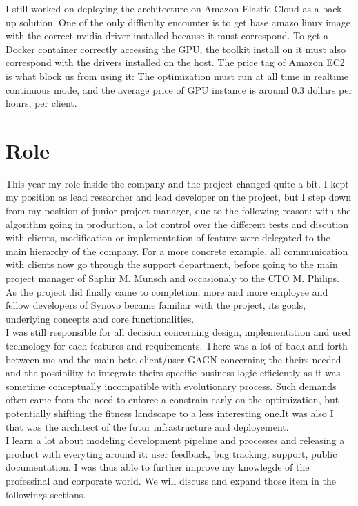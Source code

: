 \documentclass[12pt]{memoir}
\begin{document}
I still worked on deploying the architecture on Amazon Elastic Cloud as a back-up
solution. One of the only difficulty encounter is to get base amazo linux image with the
correct nvidia driver installed because it must correspond. To get a Docker
container correctly accessing the GPU, the toolkit install on it must also
correspond with the drivers installed on the host.
The price tag of Amazon EC2 is what block us from using it: The optimization must
run at all time in realtime continuous mode, and the average price of GPU instance
is around 0.3 dollars per hours, per client. 

\section{Role}

This year my role inside the company and the project changed quite a bit. I kept
my position as lead researcher and lead developer on the project, but I step
down from my position of junior project manager, due to the following reason: with
the algorithm going in production, a lot control over the different tests and discution with
clients, modification or implementation of feature were delegated to the main
hierarchy of the company. For a more concrete example, all communication with clients now
go through the support department, before going to the main project manager of
Saphir M. Munsch and occasionaly to the CTO M. Philips.\\
As the project did finally came to completion, more and more employee and fellow
developers of Synovo became familiar with the project, its goals, underlying
concepts and core functionalities. \\
I was still responsible for all decision concerning design, implementation
and used technology for each features and requirements. There was a lot of back and
forth between me and the main beta client/user GAGN concerning the theirs needed and
the possibility to integrate theirs specific business logic efficiently as it was
sometime conceptually incompatible with evolutionary process. Such demands often
came from the need to enforce a constrain early-on the optimization, but potentially
shifting the fitness landscape to a less interesting one.It was also I that was the 
architect of the futur infrastructure and deployement. \\
I learn a lot about modeling development pipeline and processes and releasing a 
product with everyting around it: user feedback, bug tracking, support, public 
documentation. I was thus able to further improve my knowlegde of the professinal
 and corporate world. We will discuss and expand those item in the followings sections.
\end{document}
